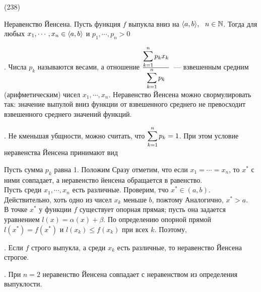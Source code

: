 (238)

\T \q Неравенство Йенсена. Пусть функция $f$ выпукла вниз на $\ang ab,\s n \in \N$. Тогда для любых $x_1,\cdots, x_n \in \ang ab$ и $p_1, \cdots, p_n > 0$ 

. Числа $p_k$ называются весами, а отношение $\frac{\dsl\sum{k = 1}n p_k x_k}{\dsl\sum{k = 1}n p_k} $~--- взвешенным средним (арифметическим) чисел $x_1, \cdots, x_n$. Неравенство Йенсена можно свормулировать так: значение выпулой вниз функции от взвешенного среднего не превосходит взвешенного среднего значений функций.

. Не кменьшая убщности, можно считать, что $\dsl\sum{k = 1}n p_k =1$. При этом условие неравенства Йенсена принимают вид 

\D Пусть сумма $p_k$ равна 1. Положим  Сразу отметим, что если $x_1 = \cdots = x_n$, то $x^*$ с ними совпадает, а неравенство йенсена обращается в равенство.\\
Пусть среди $x_1,\cdots, x_n$ есть различные. Проверим, тчо $x^* \in (a, b)$. Действительно, хоть одно из чисел $x_k$ меньше $b$, пожтому  Аналогично, $x^* > a$.\\
В точке $x^*$ у функции $f$ существует опорная прямая; пусть она задается уравнением $l(x) = \alpha(x) + \beta$. По определению опорной прямой $l(x^*) = f(x^*)$ и $l(x_k) \le f(x_k)$ при всех $k$. Поэтому, 

. Если $f$ строго выпукла, а среди $x_k$ есть различные, то неравенство Йенсена строгое.

\Zam. При $n = 2$ неравенство Йенсена совпадает с неравенством из определения выпуклости.